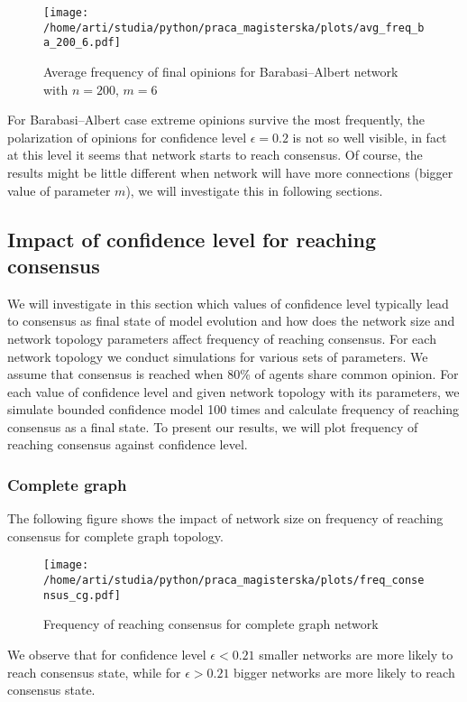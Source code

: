 \documentclass{article}
\begin{document}
\begin{figure}[H]
		\centering
		\texttt{[image: /home/arti/studia/python/praca\_magisterska/plots/avg\_freq\_ba\_200\_6.pdf]}
		\caption{Average frequency of final opinions for Barabasi--Albert network with $n=200$, $m=6$}
\end{figure}

For Barabasi--Albert case extreme opinions survive the most frequently, the polarization of opinions for confidence level $\epsilon=0.2$ is not so well visible, in fact at this level it seems that network starts to reach consensus. Of course, the results might be little different when network will have more connections (bigger value of parameter $m$), we will investigate this in following sections.

\subsection{Impact of confidence level for reaching consensus}
We will investigate in this section which values of confidence level typically lead to consensus as final state of model evolution and how does the network size and network topology parameters affect frequency of reaching consensus. For each network topology we conduct simulations for various sets of parameters. We assume that consensus is reached when 80\% of agents share common opinion. For each value of confidence level and given network topology with its parameters, we simulate bounded confidence model 100 times and calculate frequency of reaching consensus as a final state. To present our results, we will plot frequency of reaching consensus against confidence level.

\subsubsection{Complete graph}
The following figure shows the impact of network size on frequency of reaching consensus for complete graph topology.
\begin{figure}[H]
		\centering
		\texttt{[image: /home/arti/studia/python/praca\_magisterska/plots/freq\_consensus\_cg.pdf]}
		\caption{Frequency of reaching consensus for complete graph network}
		\label{freq_cg}
\end{figure}

We observe that for confidence level $\epsilon<0.21$ smaller networks are more likely to reach consensus state, while for $\epsilon>0.21$ bigger networks are more likely to reach consensus state. 
\indent
\end{document}
